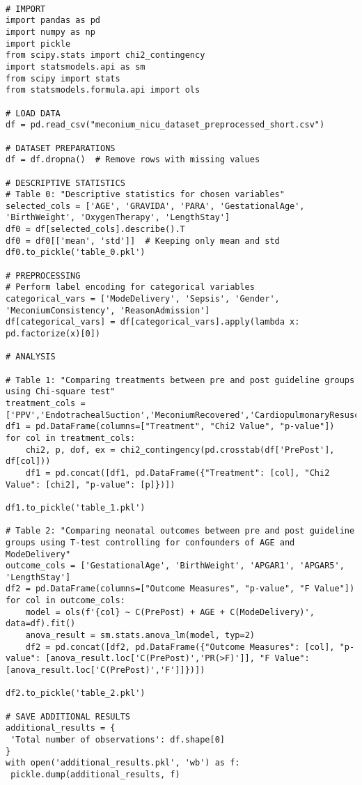 \documentclass[11pt]{article}
\begin{document}
\begin{verbatim}

# IMPORT
import pandas as pd
import numpy as np
import pickle
from scipy.stats import chi2_contingency
import statsmodels.api as sm
from scipy import stats
from statsmodels.formula.api import ols

# LOAD DATA
df = pd.read_csv("meconium_nicu_dataset_preprocessed_short.csv")

# DATASET PREPARATIONS
df = df.dropna()  # Remove rows with missing values

# DESCRIPTIVE STATISTICS
# Table 0: "Descriptive statistics for chosen variables"
selected_cols = ['AGE', 'GRAVIDA', 'PARA', 'GestationalAge', 'BirthWeight', 'OxygenTherapy', 'LengthStay']
df0 = df[selected_cols].describe().T
df0 = df0[['mean', 'std']]  # Keeping only mean and std
df0.to_pickle('table_0.pkl')

# PREPROCESSING 
# Perform label encoding for categorical variables
categorical_vars = ['ModeDelivery', 'Sepsis', 'Gender', 'MeconiumConsistency', 'ReasonAdmission']
df[categorical_vars] = df[categorical_vars].apply(lambda x: pd.factorize(x)[0])

# ANALYSIS

# Table 1: "Comparing treatments between pre and post guideline groups using Chi-square test"
treatment_cols = ['PPV','EndotrachealSuction','MeconiumRecovered','CardiopulmonaryResuscitation','OxygenTherapy']
df1 = pd.DataFrame(columns=["Treatment", "Chi2 Value", "p-value"])
for col in treatment_cols:
    chi2, p, dof, ex = chi2_contingency(pd.crosstab(df['PrePost'], df[col]))
    df1 = pd.concat([df1, pd.DataFrame({"Treatment": [col], "Chi2 Value": [chi2], "p-value": [p]})])

df1.to_pickle('table_1.pkl')

# Table 2: "Comparing neonatal outcomes between pre and post guideline groups using T-test controlling for confounders of AGE and ModeDelivery"
outcome_cols = ['GestationalAge', 'BirthWeight', 'APGAR1', 'APGAR5', 'LengthStay']
df2 = pd.DataFrame(columns=["Outcome Measures", "p-value", "F Value"])
for col in outcome_cols:
    model = ols(f'{col} ~ C(PrePost) + AGE + C(ModeDelivery)', data=df).fit()
    anova_result = sm.stats.anova_lm(model, typ=2)
    df2 = pd.concat([df2, pd.DataFrame({"Outcome Measures": [col], "p-value": [anova_result.loc['C(PrePost)','PR(>F)']], "F Value": [anova_result.loc['C(PrePost)','F']]})])

df2.to_pickle('table_2.pkl')

# SAVE ADDITIONAL RESULTS
additional_results = {
 'Total number of observations': df.shape[0]
}
with open('additional_results.pkl', 'wb') as f:
 pickle.dump(additional_results, f)

\end{verbatim}
\end{document}
